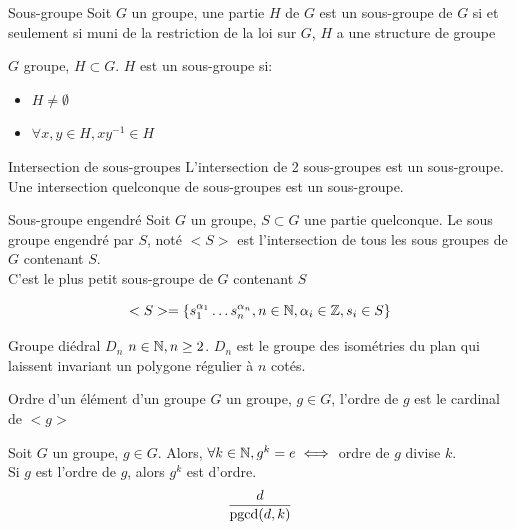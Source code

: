 \documentclass[]{report}
\begin{document}
\begin{df}{Sous-groupe}{}
    Soit $G$ un groupe, une partie $H$ de $G$ est un sous-groupe de $G$ si et seulement si muni de la restriction de la loi sur $G$, $H$ a une structure de groupe
\end{df}

\begin{prop}{}{}
    $G$ groupe, $H\subset G$. $H$ est un sous-groupe si:
    \begin{itemize}
        \item $H\neq \emptyset$
        \item $\forall x,y \in H,x y^{-1}\in H$
    \end{itemize}
\end{prop}

\begin{prop}{Intersection de sous-groupes}{}
    L'intersection de 2 sous-groupes est un sous-groupe. Une intersection quelconque de sous-groupes est un sous-groupe.
\end{prop}

\begin{df}{Sous-groupe engendré}{}
    Soit $G$ un groupe, $S\subset G$ une partie quelconque. Le sous groupe engendré par $S$, noté $<S>$ est l'intersection de tous les sous groupes de $G$ contenant $S$.\\
    C'est le plus petit sous-groupe de $G$ contenant $S$
\end{df}

\begin{prop}{}{}
    \[<S>=\{ s_1^{\alpha_1}\ldots s_n^{\alpha_n},n\in \mathbb{N},\alpha_i \in \mathbb{Z},s_i\in S\}\]
\end{prop}

\begin{ex}{Groupe diédral $D_n$}{}
    $n\in \mathbb{N},n\ge 2$. $D_n$ est le groupe des isométries du plan qui laissent invariant un polygone régulier à $n$ cotés.
\end{ex}

\begin{df}{Ordre d'un élément d'un groupe}{}
    $G$ un groupe, $g\in G$, l'ordre de $g$ est le cardinal de $<g>$
\end{df}

\begin{prop}{}{}
    Soit $G$ un groupe, $g\in G$. Alors, $\forall k\in \mathbb{N}, g^k=e\iff $ ordre de $g$ divise $k$.\\
    Si $g$ est l'ordre de $g$, alors $g^k$ est d'ordre.
    \[\frac{d}{\text{pgcd}(d,k)}\]
\end{prop}
\end{document}
